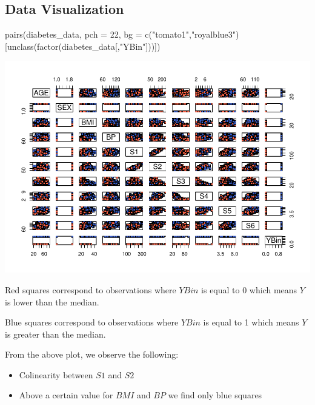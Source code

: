 \documentclass[
]{article}
\newenvironment{Shaded}{\begin{snugshade}}{\end{snugshade}}
\newcommand{\AttributeTok}[1]{\textcolor[rgb]{0.77,0.63,0.00}{#1}}
\newcommand{\DecValTok}[1]{\textcolor[rgb]{0.00,0.00,0.81}{#1}}
\newcommand{\FunctionTok}[1]{\textcolor[rgb]{0.00,0.00,0.00}{#1}}
\newcommand{\NormalTok}[1]{#1}
\newcommand{\StringTok}[1]{\textcolor[rgb]{0.31,0.60,0.02}{#1}}
\begin{document}
\hypertarget{data-visualization}{%
\subsection{Data Visualization}\label{data-visualization}}

\begin{Shaded}
\begin{Highlighting}[]
\FunctionTok{pairs}\NormalTok{(diabetes\_data, }\AttributeTok{pch =} \DecValTok{22}\NormalTok{, }\AttributeTok{bg =} \FunctionTok{c}\NormalTok{(}\StringTok{"tomato1"}\NormalTok{,}\StringTok{"royalblue3"}\NormalTok{)[}\FunctionTok{unclass}\NormalTok{(}\FunctionTok{factor}\NormalTok{(diabetes\_data[,}\StringTok{"YBin"}\NormalTok{]))])}
\end{Highlighting}
\end{Shaded}

\begin{center}\includegraphics{TP3_MERR_HABBOU_KHIDOUR_files/figure-latex/unnamed-chunk-4-1} \end{center}

Red squares correspond to observations where \(YBin\) is equal to 0
which means \(Y\) is lower than the median.

Blue squares correspond to observations where \(YBin\) is equal to 1
which means \(Y\) is greater than the median.

From the above plot, we observe the following:

\begin{itemize}
\item
  Colinearity between \(S1\) and \(S2\)
\item
  Above a certain value for \(BMI\) and \(BP\) we find only blue squares
\end{itemize}
\end{document}
